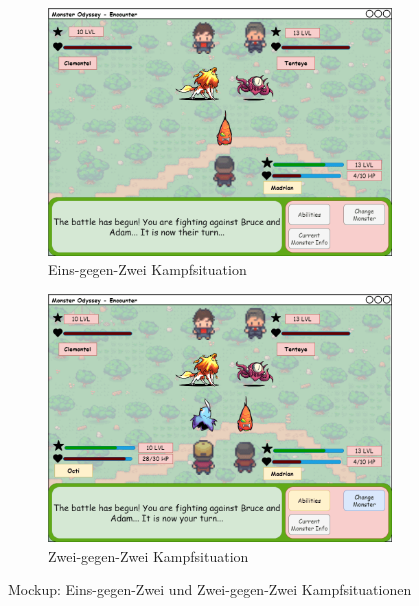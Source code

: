 \begin{figure}[H]
    \centering
    \begin{subfigure}[b]{0.4\textwidth}
        \includegraphics[width=\textwidth]{images/mockups/Encounter/Encounter1v2.png}
        \caption{Eins-gegen-Zwei Kampfsituation}
        \label{fig: Eins-gegen-Zwei Kampfsituation}
    \end{subfigure}
    \hfill
    \begin{subfigure}[b]{0.4\textwidth}
        \includegraphics[width=\textwidth]{images/mockups/Encounter/Encounter2v2.png}
        \caption{Zwei-gegen-Zwei Kampfsituation}
        \label{fig: Zwei-gegen-Zwei Kampfsituation}
    \end{subfigure}
    \caption{Mockup: Eins-gegen-Zwei und Zwei-gegen-Zwei Kampfsituationen}
    \label{fig:Eins-gegen-Zwei und Zwei-gegen-Zwei Kampfsituationen}
\end{figure}

